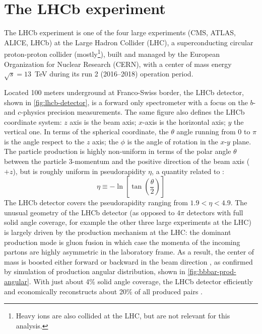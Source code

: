 \chapter{The LHCb experiment}
\label{ref:detector}

The LHCb experiment is one of the four large experiments (CMS, ATLAS, ALICE,
LHCb) at the Large Hadron Collider (LHC),
a superconducting circular proton-proton collider (mostly\footnote{
    Heavy ions are also collided at the LHC,
    but are not relevant for this analysis.
}), built and managed by
the European Organization for Nuclear Research (CERN),
with a center of mass energy
$\sqrt{s} = 13$~TeV during its run 2 (2016--2018) operation period.

Located 100 meters underground at Franco-Swiss border,
the LHCb detector,
shown in \cref{fig:lhcb-detector},
is a forward only spectrometer
with a focus on the $b$- and $c$-physics precision measurements.
The same figure also defines the LHCb coordinate system:
$z$ axis is the beam axis; $x$-axis is the horizontal axis; $y$ the vertical
one.
In terms of the spherical coordinate,
the $\theta$ angle running from 0 to $\pi$ is the angle respect to the $z$ axis;
the $\phi$ is the angle of rotation in the $x$-$y$ plane.
The particle production is highly non-uniform in terms of the polar angle
$\theta$ between the particle 3-momentum and the positive direction of the
beam axis ($+z$),
but is roughly uniform in pseudorapidity $\eta$, a quantity related to \theta:
\begin{equation}
    \eta \equiv -\ln\left[\tan\left(\frac{\theta}{2}\right)\right]
\end{equation}
The LHCb detector covers the pseudorapidity
ranging from $1.9 < \eta < 4.9$.
The unusual geometry of the LHCb detector
(as opposed to $4\pi$ detectors with full solid angle coverage,
for example the other three large experiments at the LHC)
is largely driven by the \bbbar production mechanism at the LHC:
the dominant production mode is gluon fusion in which case the momenta of the
incoming partons are highly asymmetric in the laboratory frame.
As a result, the \bbbar center of mass is boosted either forward or backward
in the beam direction \cite{Altarelli_2008},
as confirmed by simulation of \bbbar production angular distribution,
shown in \cref{fig:bbbar-prod-angular}.
With just about 4\% solid angle coverage,
the LHCb detector efficiently and economically reconstructs about 20\%
of all produced \bbbar pairs \cite{Belyaev_2021}.

